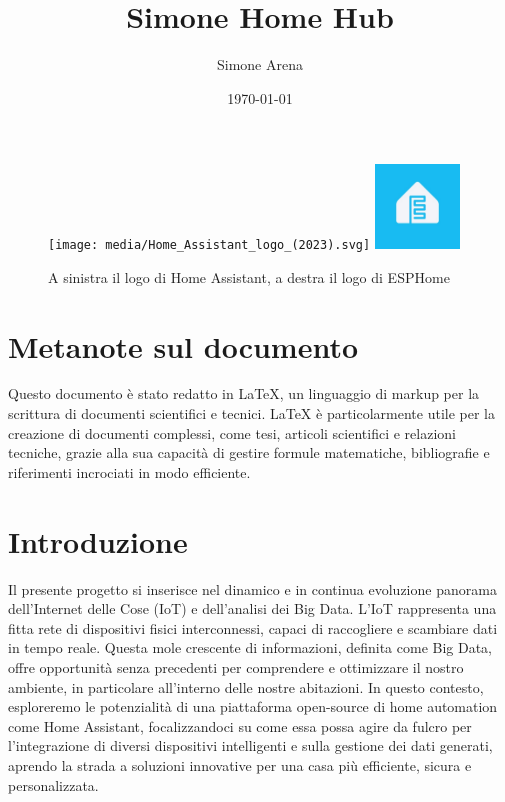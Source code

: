 \documentclass[11pt, a4paper]{article}
\title{Simone Home Hub}
\author{Simone Arena}
\date{\today}
\begin{document}
\maketitle

\begin{figure}[h!]
    \centering
    \texttt{[image: media/Home\_Assistant\_logo\_(2023).svg]}
    \hspace{1cm} %
    \includegraphics[width=0.2\textwidth]{media/esphome-logo.jpeg}
    \caption{A sinistra il logo di Home Assistant, a destra il logo di ESPHome}
    \label{fig:logos}
\end{figure}

\newpage

\tableofcontents

\newpage

\section{Metanote sul documento}
Questo documento è stato redatto in LaTeX, un linguaggio di markup per la scrittura di documenti scientifici e tecnici.
LaTeX è particolarmente utile per la creazione di documenti complessi, come tesi, articoli scientifici e relazioni tecniche, 
grazie alla sua capacità di gestire formule matematiche, bibliografie e riferimenti incrociati in modo efficiente.

\newpage

\section{Introduzione}
Il presente progetto si inserisce nel dinamico 
e in continua evoluzione panorama dell'Internet 
delle Cose (IoT) e dell'analisi dei Big Data. 
L'IoT rappresenta una fitta rete di dispositivi 
fisici interconnessi, capaci di raccogliere e 
scambiare dati in tempo reale. Questa mole crescente 
di informazioni, definita come Big Data, offre opportunità 
senza precedenti per comprendere e ottimizzare il nostro ambiente, 
in particolare all'interno delle nostre abitazioni. 
In questo contesto, esploreremo le potenzialità di una 
piattaforma open-source di home automation come Home Assistant, 
focalizzandoci su come essa possa agire da fulcro per l'integrazione 
di diversi dispositivi intelligenti e sulla gestione dei dati generati, 
aprendo la strada a soluzioni innovative per una casa più efficiente, 
sicura e personalizzata.
\end{document}
